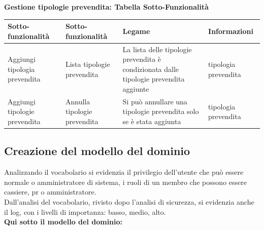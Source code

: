 \documentclass[a4paper]{article}
\begin{document}
\textbf{Gestione tipologie prevendita: Tabella Sotto-Funzionalità}

\begin{center}
    \begin{tabularx}{1\textwidth}{|X|X|X|X|}
    \hline
    \textbf{Sotto-funzionalità} & \textbf{Sotto-funzionalità} & \textbf{Legame} & \textbf{Informazioni}\\
    \hline
    \hline
    Aggiungi tipologia prevendita & Lista tipologie prevendita & La lista delle tipologie prevendita è condizionata dalle tipologie prevendita aggiunte & tipologia prevendita\\
    \hline
    Aggiungi tipologie prevendita & Annulla tipologie prevendita & Si può annullare una tipologie prevendita solo se è stata aggiunta & tipologia prevendita\\
    \hline
    \end{tabularx}
\end{center}

\newpage

\subsection{Creazione del modello del dominio}

Analizzando il vocabolario si evidenzia il privilegio dell'utente che può essere normale o amministratore di sistema, i ruoli di un membro che possono essere cassiere, pr o amministratore.\\Dall'analisi del vocabolario, rivisto dopo l'analisi di sicurezza, si evidenzia anche il log, con i livelli di importanza: basso, medio, alto.\\\textbf{Qui sotto il modello del dominio:}\\


\end{document}
